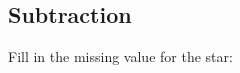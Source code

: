 \subsection{Subtraction}
\begin{questions}
    \Question[3] Fill in the missing value for the star:
    \begin{multicols}{3}
\end{multicols}
\end{questions}
